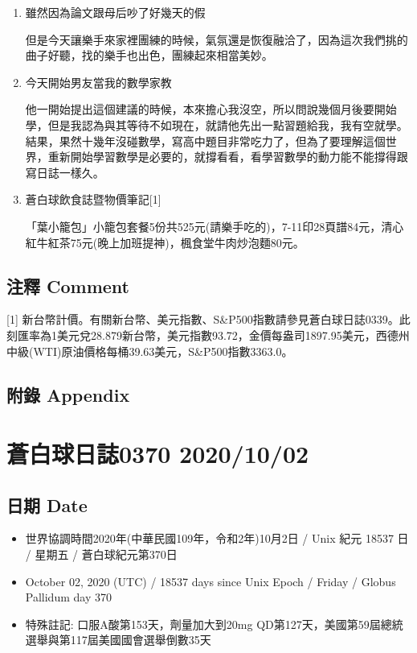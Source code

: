 \documentclass[
]{article}
\providecommand{\tightlist}{%
  \setlength{\itemsep}{0pt}\setlength{\parskip}{0pt}}
\begin{document}
\begin{enumerate}
\def\labelenumi{\arabic{enumi}.}
\item
  雖然因為論文跟母后吵了好幾天的假

  但是今天讓樂手來家裡團練的時候，氣氛還是恢復融洽了，因為這次我們挑的曲子好聽，找的樂手也出色，團練起來相當美妙。
\item
  今天開始男友當我的數學家教

  他一開始提出這個建議的時候，本來擔心我沒空，所以問說幾個月後要開始學，但是我認為與其等待不如現在，就請他先出一點習題給我，我有空就學。結果，果然十幾年沒碰數學，寫高中題目非常吃力了，但為了要理解這個世界，重新開始學習數學是必要的，就撐看看，看學習數學的動力能不能撐得跟寫日誌一樣久。
\item
  蒼白球飲食誌暨物價筆記{[}1{]}

  「葉小籠包」小籠包套餐5份共525元(請樂手吃的)，7-11印28頁譜84元，清心紅牛紅茶75元(晚上加班提神)，楓食堂牛肉炒泡麵80元。
\end{enumerate}

\hypertarget{ux6ce8ux91cb-comment-28}{%
\subsection{注釋 Comment}\label{ux6ce8ux91cb-comment-28}}

{[}1{]}
新台幣計價。有關新台幣、美元指數、S\&P500指數請參見蒼白球日誌0339。此刻匯率為1美元兌28.879新台幣，美元指數93.72，金價每盎司1897.95美元，西德州中級(WTI)原油價格每桶39.63美元，S\&P500指數3363.0。

\hypertarget{ux9644ux9304-appendix-28}{%
\subsection{附錄 Appendix}\label{ux9644ux9304-appendix-28}}

\hypertarget{ux84bcux767dux7403ux65e5ux8a8c0370-20201002}{%
\section{蒼白球日誌0370
2020/10/02}\label{ux84bcux767dux7403ux65e5ux8a8c0370-20201002}}

\hypertarget{ux65e5ux671f-date-29}{%
\subsection{日期 Date}\label{ux65e5ux671f-date-29}}

\begin{itemize}
\tightlist
\item
  世界協調時間2020年(中華民國109年，令和2年)10月2日 / Unix 紀元 18537 日
  / 星期五 / 蒼白球紀元第370日
\item
  October 02, 2020 (UTC) / 18537 days since Unix Epoch / Friday / Globus
  Pallidum day 370
\item
  特殊註記: 口服A酸第153天，劑量加大到20mg
  QD第127天，美國第59屆總統選舉與第117屆美國國會選舉倒數35天
\end{itemize}
\end{document}
